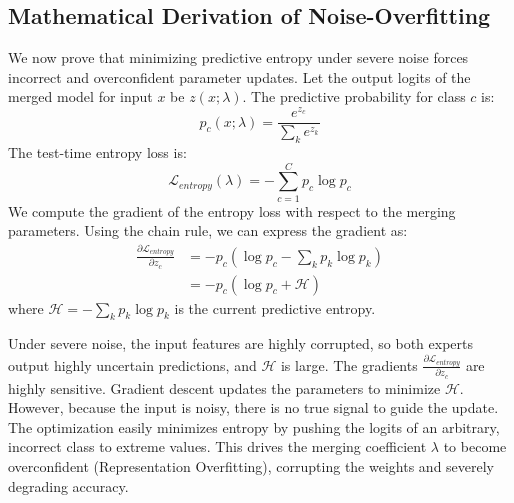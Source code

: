 \documentclass{article}
\theoremstyle{plain}
\theoremstyle{definition}
\theoremstyle{remark}
\begin{document}
\subsection{Mathematical Derivation of Noise-Overfitting}
We now prove that minimizing predictive entropy under severe noise forces incorrect and overconfident parameter updates. Let the output logits of the merged model for input $x$ be $z(x; \lambda)$. The predictive probability for class $c$ is:
\begin{equation}
    p_c(x; \lambda) = \frac{e^{z_c}}{\sum_k e^{z_k}}
\end{equation}
The test-time entropy loss is:
\begin{equation}
    \mathcal{L}_{entropy}(\lambda) = -\sum_{c=1}^C p_c \log p_c
\end{equation}
We compute the gradient of the entropy loss with respect to the merging parameters. Using the chain rule, we can express the gradient as:
\begin{align}
    \frac{\partial \mathcal{L}_{entropy}}{\partial z_c} &= -p_c \left(\log p_c - \sum_k p_k \log p_k\right) \nonumber \\
    &= -p_c (\log p_c + \mathcal{H})
\end{align}
where $\mathcal{H} = -\sum_k p_k \log p_k$ is the current predictive entropy.

Under severe noise, the input features are highly corrupted, so both experts output highly uncertain predictions, and $\mathcal{H}$ is large. The gradients $\frac{\partial \mathcal{L}_{entropy}}{\partial z_c}$ are highly sensitive. 
Gradient descent updates the parameters to minimize $\mathcal{H}$. 
However, because the input is noisy, there is no true signal to guide the update. The optimization easily minimizes entropy by pushing the logits of an arbitrary, incorrect class to extreme values. This drives the merging coefficient $\lambda$ to become overconfident (Representation Overfitting), corrupting the weights and severely degrading accuracy.
\end{document}
